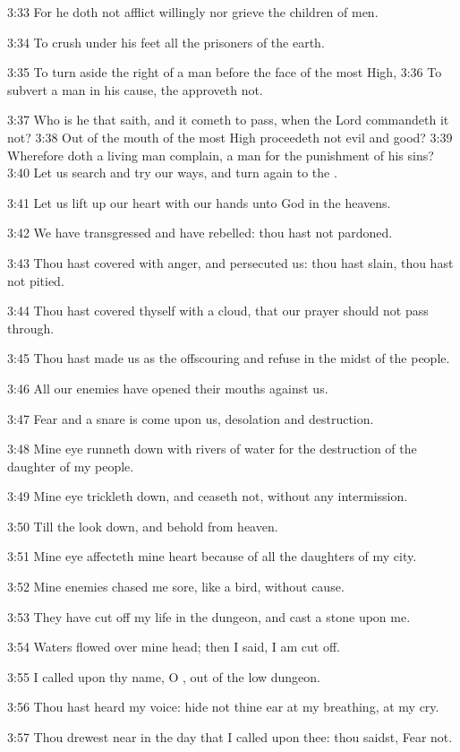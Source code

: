 3:33 For he doth not afflict willingly nor grieve the children of men.

3:34 To crush under his feet all the prisoners of the earth.

3:35 To turn aside the right of a man before the face of the most
High, 3:36 To subvert a man in his cause, the \LORD approveth not.

3:37 Who is he that saith, and it cometh to pass, when the Lord
commandeth it not?  3:38 Out of the mouth of the most High proceedeth
not evil and good?  3:39 Wherefore doth a living man complain, a man
for the punishment of his sins?  3:40 Let us search and try our ways,
and turn again to the \LORD.

3:41 Let us lift up our heart with our hands unto God in the heavens.

3:42 We have transgressed and have rebelled: thou hast not pardoned.

3:43 Thou hast covered with anger, and persecuted us: thou hast slain,
thou hast not pitied.

3:44 Thou hast covered thyself with a cloud, that our prayer should
not pass through.

3:45 Thou hast made us as the offscouring and refuse in the midst of
the people.

3:46 All our enemies have opened their mouths against us.

3:47 Fear and a snare is come upon us, desolation and destruction.

3:48 Mine eye runneth down with rivers of water for the destruction of
the daughter of my people.

3:49 Mine eye trickleth down, and ceaseth not, without any
intermission.

3:50 Till the \LORD look down, and behold from heaven.

3:51 Mine eye affecteth mine heart because of all the daughters of my
city.

3:52 Mine enemies chased me sore, like a bird, without cause.

3:53 They have cut off my life in the dungeon, and cast a stone upon
me.

3:54 Waters flowed over mine head; then I said, I am cut off.

3:55 I called upon thy name, O \LORD, out of the low dungeon.

3:56 Thou hast heard my voice: hide not thine ear at my breathing, at
my cry.

3:57 Thou drewest near in the day that I called upon thee: thou
saidst, Fear not.

